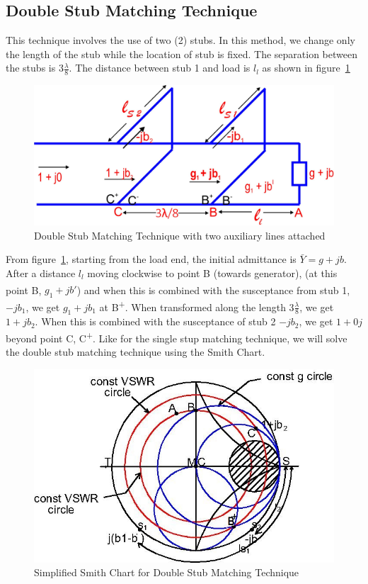 \subsection{Double Stub Matching Technique}
This technique involves the use of two (2) stubs. In this method, we change only the length of the stub while the location of stub is fixed. The separation between the stubs is $3\frac{\lambda}{8}$. The distance between stub 1 and load is $l_l$ as shown in figure~\ref{fig:fig12}
\begin{figure}[h]
\centering
\includegraphics[width=1\linewidth]{./graphics/fig12}
\caption{Double Stub Matching Technique with two auxiliary lines attached}
\label{fig:fig12}
\end{figure}
From figure~\ref{fig:fig12}, starting from the load end, the initial admittance is $\bar{Y} = g + jb$. After a distance $l_l$ moving clockwise to point B (towards generator), (at this point B\textsuperscript{\textemdash}, $g_1 + jb'$) and when this is combined with the susceptance from stub 1, $-jb_1$, we get $g_1 +jb_1$ at B\textsuperscript{+}. When transformed along the length $3\frac{\lambda}{8}$, we get $1 + jb_2$. When this is combined with the susceptance of stub 2 $-jb_2$, we get $1 + 0j$ beyond point C, C\textsuperscript{+}. Like for the single stup matching technique, we will solve the double stub matching technique using the Smith Chart.
\begin{figure}[h]
\centering
\includegraphics[width=1\linewidth]{./graphics/dousmith}
\caption{Simplified Smith Chart for Double Stub Matching Technique}
\label{fig:dousmith}
\end{figure}

